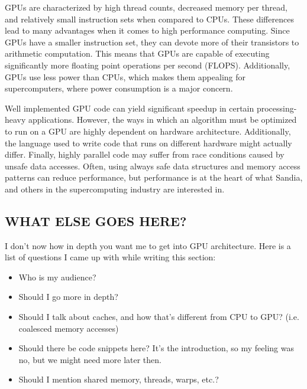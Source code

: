 GPUs are characterized by high thread counts, decreased memory per thread, and
relatively small instruction sets when compared to CPUs. These differences lead
to many advantages when it comes to high performance computing. Since GPUs have
a smaller instruction set, they can devote more of their transistors to
arithmetic computation. This means that GPUs are capable of executing
significantly more floating point operations per second (FLOPS). Additionally,
GPUs use less power than CPUs, which makes them appealing for supercomputers,
where power consumption is a major concern.

Well implemented GPU code can yield significant speedup in certain
processing-heavy applications.  However, the ways in which an algorithm must be
optimized to run on a GPU are highly dependent on hardware architecture. Additionally, the language
used to write code that runs on different hardware might actually differ.  Finally, 
highly parallel code may suffer from race conditions caused by unsafe data accesses.
Often, using always safe data structures and memory access patterns can reduce performance, 
but performance is at the heart of what Sandia, and others in the supercomputing industry
are %
interested in.

\subsection{WHAT ELSE GOES HERE?}
I don't now how in depth you want me to get into GPU architecture. Here is a list of questions I came up 
with while writing this section:
\begin{itemize}
	\item Who is my audience?
	\item Should I go more in depth?
	\item Should I talk about caches, and how that's different from CPU to GPU? (i.e. coalesced memory accesses)
	\item Should there be code snippets here? It's the introduction, so my feeling was no, but we might need more later then.
	\item Should I mention shared memory, threads, warps, etc.?
\end{itemize}










